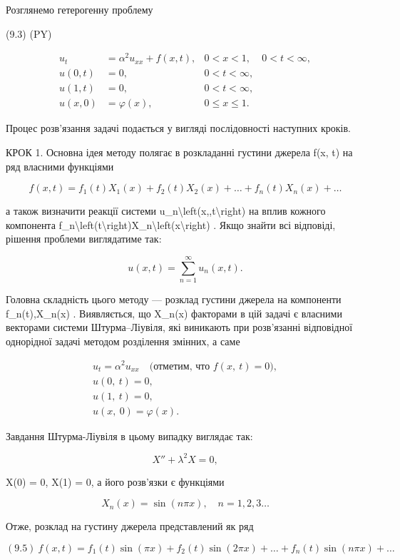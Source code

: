 \documentclass[
]{article}
\begin{document}
Розглянемо гетерогенну проблему

(9.3) (PY)

\[
\begin{aligned} u_t &= \alpha^2 u_{xx} + f(x, t), & 0 < x < 1, & 0 < t < \infty, \\ u(0, t) &= 0, & 0 < t < \infty, \\ u(1, t) &= 0, & 0 < t < \infty, \\ u(x, 0) &= \varphi(x), & 0 \leqslant x \leqslant 1. \end{aligned}
\]

Процес розв'язання задачі подається у вигляді послідовності наступних
кроків.

КРОК 1. Основна ідея методу полягає в розкладанні густини джерела f(x,
t) на ряд власними функціями

\[
f(x, t) = f_1(t) X_1(x) + f_2(t) X_2(x) + \dots + f_n(t) X_n(x) + \dots
\]

а також визначити реакції системи
u\_n\textbackslash left(x,,t\textbackslash right) на вплив кожного
компонента
f\_n\textbackslash left(t\textbackslash right)X\_n\textbackslash left(x\textbackslash right)
. Якщо знайти всі відповіді, рішення проблеми виглядатиме так:

\[
u(x, t) = \sum_{n=1}^{\infty} u_n(x, t).
\]

Головна складність цього методу --- розклад густини джерела на
компоненти f\_n(t),X\_n(x) . Виявляється, що X\_n(x) факторами в цій
задачі є власними векторами системи Штурма--Ліувіля, які виникають при
розв'язанні відповідної однорідної задачі методом розділення змінних, а
саме

\[
\begin{aligned} u_t = \alpha^2 u_{xx} \quad \text{(отметим, что } f(x, \ t) = 0), \\ u(0, \ t) = 0, \\ u(1, \ t) = 0, \\ u(x, \ 0) = \varphi(x). \end{aligned}
\]

Завдання Штурма-Ліувіля в цьому випадку виглядає так:

\[
X'' + \lambda^2 X = 0,
\]

X(0) = 0, X(1) = 0, а його розв'язки є функціями

\[
X_n(x) = \sin(n\pi x), \quad n = 1, 2, 3 \dots
\]

Отже, розклад на густину джерела представлений як ряд

\[
(9.5) \ f(x,t) = f_1(t) \sin(\pi x) + f_2(t) \sin(2\pi x) + \dots + f_n(t) \sin(n\pi x) + \dots
\]
\end{document}
